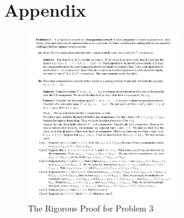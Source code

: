 \documentclass[12pt,a4paper]{article}
\makeatletter
\newtheorem*{solution}{Solution}
\theoremstyle{definition}
\renewenvironment{solution}[1][Solution] {\par\pushQED{\qed}\normalfont\topsep6\p@\@plus6\p@\relax\trivlist\item[\hskip\labelsep\bfseries#1\@addpunct{.}]\ignorespaces}{\popQED\endtrivlist\@endpefalse} \makeatother
\makeatother
\begin{document}
\begin{enumerate}
\begin{solution}
\begin{enumerate}
\end{enumerate}
\end{solution}
\section*{Appendix}
\begin{figure}[htbp]
    \centering
    \includegraphics[width=0.6\textwidth]{rigorous_solution.PNG}
    \caption{The Rigorous Proof for Problem 3}\label{solution}
\end{figure}
\end{document}
